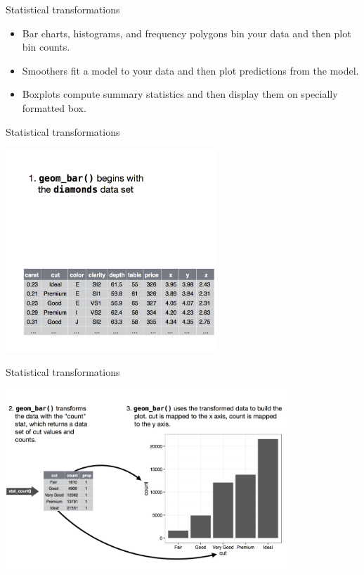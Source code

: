\documentclass[ignorenonframetext,]{beamer}
\begin{document}
\begin{frame}{Statistical transformations}
\protect\hypertarget{statistical-transformations-1}{}

\begin{itemize}
\item
  Bar charts, histograms, and frequency polygons bin your data and then
  plot bin counts.
\item
  Smoothers fit a model to your data and then plot predictions from the
  model.
\item
  Boxplots compute summary statistics and then display them on specially
  formatted box.
\end{itemize}

\end{frame}

\begin{frame}{Statistical transformations}
\protect\hypertarget{statistical-transformations-2}{}

\includegraphics[width=3.125in,height=\textheight]{figures/st1.png}

\end{frame}

\begin{frame}{Statistical transformations}
\protect\hypertarget{statistical-transformations-3}{}

\includegraphics[width=4.16667in,height=\textheight]{figures/st2.png}

\end{frame}
\end{document}
